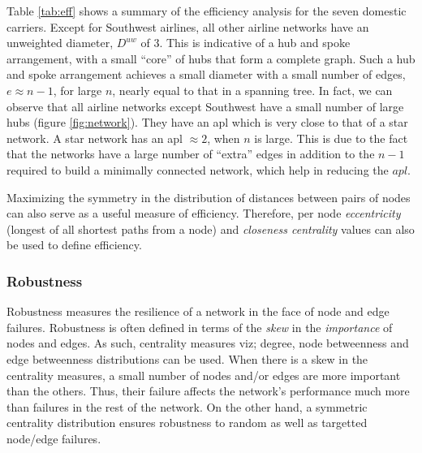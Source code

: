 \documentclass[10pt]{article}
\begin{document}

Table \ref{tab:eff} shows a summary of the efficiency analysis for the seven domestic carriers. Except for Southwest airlines, all other airline networks have an unweighted diameter, $D^{uw}$ of $3$. This is indicative of a hub and spoke arrangement, with a small ``core'' of hubs that form a complete graph. Such a hub and spoke arrangement achieves a small diameter with a small number of edges,  $e \approx n - 1$, for large $n$, nearly equal to that in a spanning tree. In fact, we can observe that all airline networks except Southwest have a small number of large hubs (figure \ref{fig:network}). They have an apl which is very close to that of a star network. A star network has an apl $\approx 2$, when $n$ is large. This is due to the fact that the networks have a large number of ``extra'' edges in addition to the $n - 1$ required to build a minimally connected network, which help in reducing the $apl$.


Maximizing the symmetry in the distribution of distances between pairs of nodes can also serve as a useful measure of efficiency. Therefore, per node \textit{eccentricity} (longest of all shortest paths from a node) and \textit{closeness centrality} values can also be used to define efficiency.

\subsubsection{Robustness}
Robustness measures the resilience of a network in the face of node and edge failures. Robustness is often defined in terms of the \textit{skew} in the \textit{importance} of nodes and edges. As such, centrality measures viz; degree, node betweenness and edge betweenness distributions can be used. When there is a skew in the centrality measures, a small number of nodes and/or edges are more important than the others. Thus, their failure affects the network's performance much more than failures in the rest of the network. On the other hand, a symmetric centrality distribution ensures robustness to random as well as targetted node/edge failures.
\end{document}
